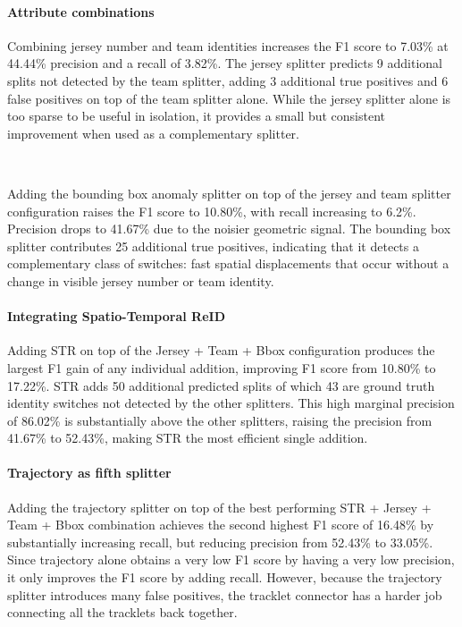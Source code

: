 \paragraph{Attribute combinations}
Combining jersey number and team identities increases the F1 score to 7.03\% at 44.44\% precision and a recall of 3.82\%. The jersey splitter predicts 9 additional splits not detected by the team splitter, adding 3 additional true positives and 6 false positives on top of the team splitter alone. While the jersey splitter alone is too sparse to be useful in isolation, it provides a small but consistent improvement when used as a complementary splitter.

\

Adding the bounding box anomaly splitter on top of the jersey and team splitter configuration raises the F1 score to 10.80\%, with recall increasing to 6.2\%. Precision drops to 41.67\% due to the noisier geometric signal. The bounding  box splitter contributes 25 additional true positives, indicating that it detects a complementary class of switches: fast spatial displacements that occur without a change in visible jersey number or team identity. 


\paragraph{Integrating Spatio-Temporal ReID}
Adding STR on top of the Jersey + Team + Bbox configuration produces the largest F1 gain of any individual addition, improving F1 score from 10.80\% to 17.22\%. STR adds 50 additional predicted splits of which 43 are ground truth identity switches not detected by the other splitters. This high marginal precision of 86.02\% is substantially above the other splitters, raising the precision from 41.67\% to  52.43\%, making STR the most efficient single addition.

\paragraph{Trajectory as fifth splitter}
Adding the trajectory splitter on top of the best performing  STR + Jersey + Team + Bbox combination achieves the second highest F1 score of 16.48\% by substantially increasing recall, but reducing precision from 52.43\% to 33.05\%. Since trajectory alone obtains a very low F1 score by having a very low precision, it only improves the F1 score by adding recall. However, because the trajectory splitter introduces many false positives, the tracklet connector has a harder job connecting all the tracklets back together.  

